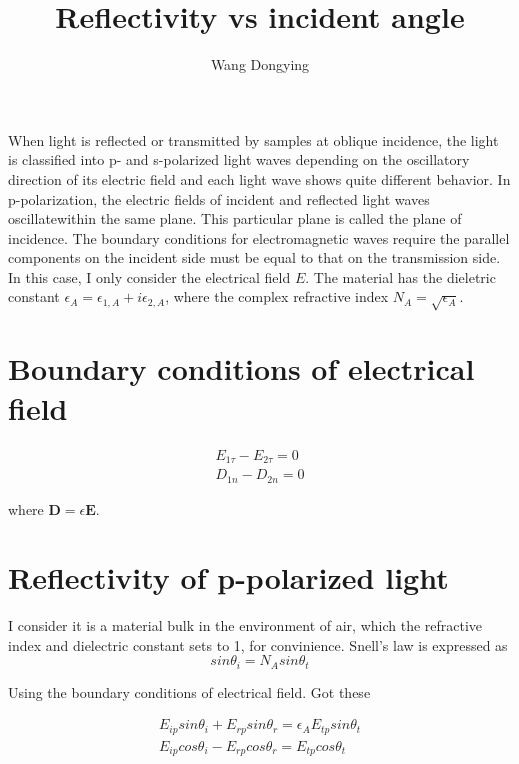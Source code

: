 \documentclass{article}
\author{Wang Dongying}
\title{Reflectivity vs incident angle}
\begin{document}
\maketitle

	When light is reflected or transmitted by samples at oblique incidence, the light is classified into p- and s-polarized light waves depending on the oscillatory direction of its electric field and each light wave shows quite different behavior. In p-polarization, the electric fields of incident and reflected light waves oscillatewithin the same plane. This particular plane is called the plane of incidence. The boundary conditions for electromagnetic waves require the parallel components on the incident side must be equal to that on the transmission side.\\

	In this case, I only consider the electrical field $E$. The material has the dieletric constant $\epsilon_{A} = \epsilon_{1,A} + i\epsilon_{2,A}$, where the complex refractive index $N_{A} = \sqrt{\epsilon_{A}}$.

	\section{Boundary conditions of electrical field}

		\begin{equation}
		\begin{aligned}
			E_{1\tau} - E_{2\tau} = 0\\
			D_{1n} - D_{2n} = 0
		\end{aligned}
		\end{equation}

		where $\bm{D} = \epsilon\bm{E}$.

	\section{Reflectivity of p-polarized light}
		I consider it is a material bulk in the environment of air, which the refractive index and dielectric constant sets to 1, for convinience. Snell's law is expressed as
		\begin{equation}
			sin\theta_{i} = N_{A}sin\theta_{t}
		\end{equation}

		Using the boundary conditions of electrical field. Got these

		\begin{equation}
		\begin{aligned}
			E_{ip}sin\theta_{i} + E_{rp}sin\theta_{r} = \epsilon_{A}E_{tp}sin\theta_{t}\\
			E_{ip}cos\theta_{i} - E_{rp}cos\theta_{r} = E_{tp}cos\theta_{t}	
		\end{aligned}
		\end{equation}
\end{document}
